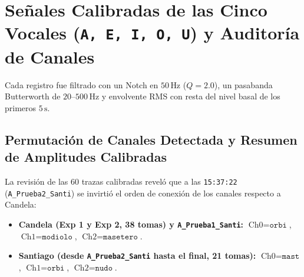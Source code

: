 \documentclass[11pt, a4paper]{article}
\begin{document}
\section{Señales Calibradas de las Cinco Vocales (\texttt{A, E, I, O, U}) y Auditoría de Canales}

Cada registro fue filtrado con un Notch en $50\,\text{Hz}$ ($Q=2.0$), un pasabanda Butterworth de $20\text{--}500\,\text{Hz}$ y envolvente RMS con resta del nivel basal de los primeros $5\,\text{s}$.

\subsection{Permutación de Canales Detectada y Resumen de Amplitudes Calibradas}
La revisión de las 60 trazas calibradas reveló que a las \texttt{15:37:22} (\texttt{A\_Prueba2\_Santi}) se invirtió el orden de conexión de los canales respecto a Candela:
\begin{itemize}\setlength{\itemsep}{1pt}
    \item \textbf{Candela (Exp 1 y Exp 2, 38 tomas) y \texttt{A\_Prueba1\_Santi}:} $\text{Ch0} = \texttt{orbi}$, $\text{Ch1} = \texttt{modiolo}$, $\text{Ch2} = \texttt{masetero}$.
    \item \textbf{Santiago (desde \texttt{A\_Prueba2\_Santi} hasta el final, 21 tomas):} $\text{Ch0} = \texttt{mast}$, $\text{Ch1} = \texttt{orbi}$, $\text{Ch2} = \texttt{nudo}$.
\end{itemize}
\end{document}
